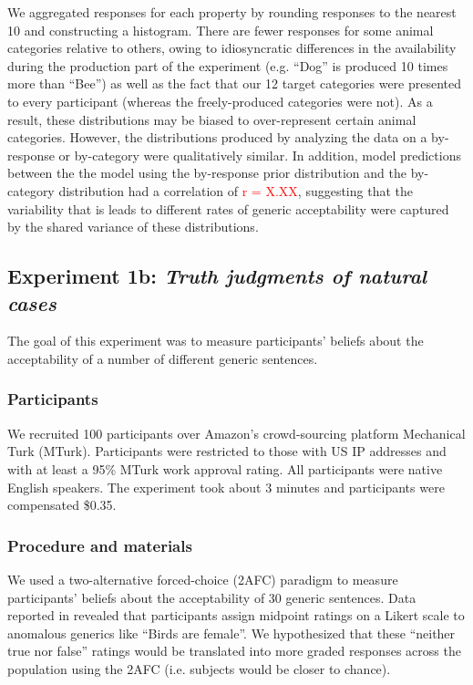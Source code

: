 \documentclass[10pt,letterpaper]{article}
\newcommand{\red}[1]{\textcolor{Red}{#1}}
\begin{document}
We aggregated responses for each property by rounding responses to the nearest 10 and constructing a histogram. 
There are fewer responses for some animal categories relative to others, owing to idiosyncratic differences in the availability during the production part of the experiment (e.g. ``Dog'' is produced 10 times more than ``Bee'') as well as the fact that our 12 target categories were presented to every participant (whereas the freely-produced categories were not). 
As a result, these distributions may be biased to over-represent certain animal categories. 
However, the distributions produced by analyzing the data on a by-response or by-category were qualitatively similar. 
In addition, model predictions between the the model using the by-response prior distribution and the by-category distribution had a correlation of \red{r = X.XX}, suggesting that the variability that is leads to different rates of generic acceptability were captured by the shared variance of these distributions. 


\subsection{Experiment 1b: \emph{Truth judgments of natural cases}}

The goal of this experiment was to measure participants' beliefs about the acceptability of a number of different generic sentences. 


\subsubsection{Participants}

We recruited 100 participants over Amazon's crowd-sourcing platform Mechanical Turk (MTurk).  Participants were restricted to those with US IP addresses and with at least a 95\% MTurk work approval rating. All participants were native English speakers. The experiment took about 3 minutes and participants were compensated \$0.35.

\subsubsection{Procedure and materials}

We used a two-alternative forced-choice (2AFC) paradigm to measure participants' beliefs about the acceptability of 30 generic sentences. 
Data reported in  revealed that participants assign midpoint ratings on a Likert scale to anomalous generics like ``Birds are female''. 
We hypothesized that these ``neither true nor false'' ratings would be translated into more graded responses across the population using the 2AFC (i.e. subjects would be closer to chance).
\end{document}
